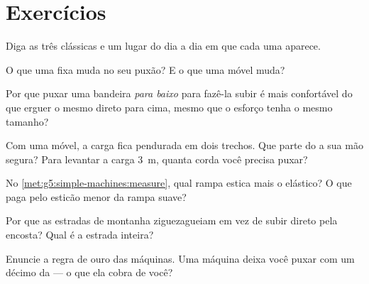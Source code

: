 \section{Exercícios}

\begin{exercise}[$\star$]\label{exo:g5:simple-machines:1}
Diga as três  clássicas e um lugar do dia a dia em
que cada uma aparece.
\end{exercise}

\begin{exercise}[$\star$]\label{exo:g5:simple-machines:2}
O que uma  fixa muda no seu puxão? E o que uma  móvel
muda?
\end{exercise}

\begin{exercise}[$\star$]\label{exo:g5:simple-machines:3}
Por que puxar uma bandeira \emph{para baixo} para fazê-la subir é
mais confortável do que erguer o mesmo  direto para cima, mesmo
que o esforço tenha o mesmo tamanho?
\end{exercise}

\begin{exercise}[$\star$]\label{exo:g5:simple-machines:4}
Com uma  móvel, a carga fica pendurada em dois trechos. Que
parte do  a sua mão segura? Para levantar a carga \qty{3}{m},
quanta corda você precisa puxar?
\end{exercise}

\begin{exercise}[$\star$]\label{exo:g5:simple-machines:5}
No \cref{met:g5:simple-machines:measure}, qual rampa estica mais o
elástico? O que paga pelo esticão menor da rampa suave?
\end{exercise}

\begin{exercise}[$\star$]\label{exo:g5:simple-machines:6}
Por que as estradas de montanha ziguezagueiam em vez de subir direto
pela encosta? Qual  é a estrada inteira?
\end{exercise}

\begin{exercise}[$\star$]\label{exo:g5:simple-machines:7}
Enuncie a regra de ouro das máquinas. Uma máquina deixa você puxar
com um décimo da  --- o que ela cobra de você?
\end{exercise}

